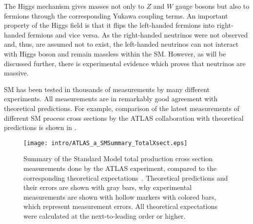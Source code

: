 The Higgs mechanism gives masses not only to $Z$ and $W$ gauge bosons but also to fermions through the corresponding Yukawa coupling terms. An important property of the Higgs field is that it flips the left-handed fermions into right-handed fermions and vice versa. 
As the right-handed neutrinos were not observed and, thus, are assumed not to exist, the left-handed
neutrinos can not interact with Higgs boson and remain massless within the SM. 
However, as will be discussed further, there is experimental evidence which proves that neutrinos are massive.

SM has been tested in thousands of measurements by many different experiments.
All measurements are in remarkably good agreement with theoretical predictions.
For example, comparison of the latest measurements of different SM process cross sections by the ATLAS collaboration with theoretical predictions is shown in
.

\begin{figure}[]
  \centering
  \texttt{[image: intro/ATLAS\_a\_SMSummary\_TotalXsect.eps]}
  \caption{
  Summary of the Standard Model total production cross section measurements done by the ATLAS experiment, compared to the corresponding theoretical expectations~\cite{sm_atlas_public_plots_2016}. 
  Theoretical predictions and their errors are shown with gray bars, why experimental
  measurements are shown with hollow markers with colored bars, which represent measurement errors.
  All theoretical expectations were calculated at the next-to-leading order or higher. 
  }
  \label{fig:SM_theory_vs_data}
\end{figure}








